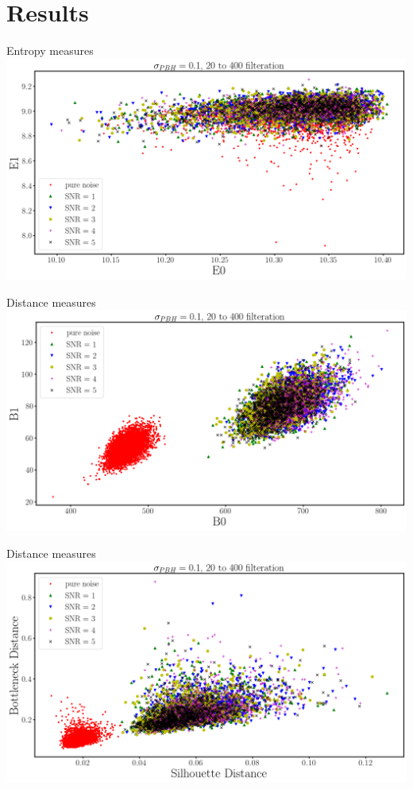 
\section{Results}
\frame{\sectionpage}

\begin{frame}{Entropy measures}
\centering
\includegraphics[height=.8\textheight]{img/E0_E1_SNR}
\end{frame}

\begin{frame}{Distance measures}
	\centering
	\includegraphics[height=.8\textheight]{img/B0_B1_SNR}
\end{frame}

\begin{frame}{Distance measures}
	\centering
	\includegraphics[height=.8\textheight]{img/SD_BD_SNR}
\end{frame}

